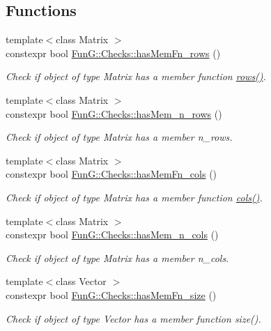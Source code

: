 \subsection*{Functions}
\begin{DoxyCompactItemize}
\item 
{\footnotesize template$<$class Matrix $>$ }\\constexpr bool \hyperlink{group__ConceptCheck_ga68fd30eff9d106c399b2b0e9a1f1b822}{Fun\-G\-::\-Checks\-::has\-Mem\-Fn\-\_\-rows} ()
\begin{DoxyCompactList}\small\item\em Check if object of type Matrix has a member function \hyperlink{namespaceFunG_1_1LinearAlgebra_abd3afa2fcd2194787342b2662cfa9f5a}{rows()}. \end{DoxyCompactList}\item 
{\footnotesize template$<$class Matrix $>$ }\\constexpr bool \hyperlink{group__ConceptCheck_ga6f66adbc63ed46140f1080e9914cb5de}{Fun\-G\-::\-Checks\-::has\-Mem\-\_\-n\-\_\-rows} ()
\begin{DoxyCompactList}\small\item\em Check if object of type Matrix has a member n\-\_\-rows. \end{DoxyCompactList}\item 
{\footnotesize template$<$class Matrix $>$ }\\constexpr bool \hyperlink{group__ConceptCheck_ga4979df2d7b7abebb0253a569e41274b1}{Fun\-G\-::\-Checks\-::has\-Mem\-Fn\-\_\-cols} ()
\begin{DoxyCompactList}\small\item\em Check if object of type Matrix has a member function \hyperlink{namespaceFunG_1_1LinearAlgebra_ae981b8bee32eea3ce87f41874835c9c1}{cols()}. \end{DoxyCompactList}\item 
{\footnotesize template$<$class Matrix $>$ }\\constexpr bool \hyperlink{group__ConceptCheck_ga0a87aaa714499abcaabd921297be61e4}{Fun\-G\-::\-Checks\-::has\-Mem\-\_\-n\-\_\-cols} ()
\begin{DoxyCompactList}\small\item\em Check if object of type Matrix has a member n\-\_\-cols. \end{DoxyCompactList}\item 
{\footnotesize template$<$class Vector $>$ }\\constexpr bool \hyperlink{group__ConceptCheck_ga5e3c3b091f6457e00e7c238cb27def3c}{Fun\-G\-::\-Checks\-::has\-Mem\-Fn\-\_\-size} ()
\begin{DoxyCompactList}\small\item\em Check if object of type Vector has a member function size(). \end{DoxyCompactList}\end{DoxyCompactItemize}
